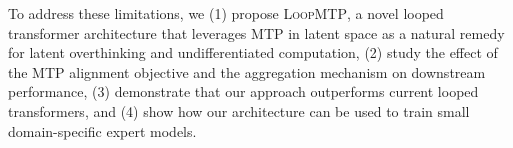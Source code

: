 To address these limitations, we (1) propose \textsc{LoopMTP}, a novel looped transformer architecture that leverages MTP in latent space as a natural remedy for latent overthinking and undifferentiated computation, (2) study the effect of the MTP alignment objective and the aggregation mechanism on downstream performance, (3) demonstrate that our approach outperforms current looped transformers, and (4) show how our architecture can be used to train small domain-specific expert models.





    
    
    
